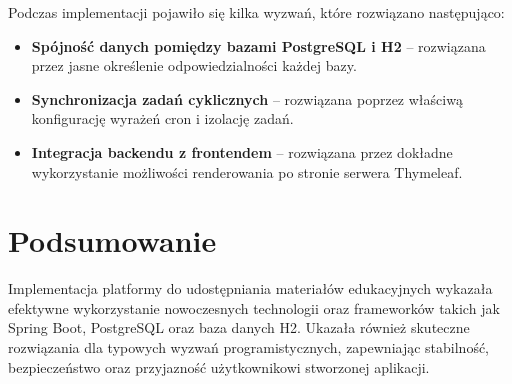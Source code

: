 Podczas implementacji pojawiło się kilka wyzwań, które rozwiązano następująco:

\begin{itemize}
\item \textbf{Spójność danych pomiędzy bazami PostgreSQL i H2} – rozwiązana przez jasne określenie odpowiedzialności każdej bazy.
\item \textbf{Synchronizacja zadań cyklicznych} – rozwiązana poprzez właściwą konfigurację wyrażeń cron i izolację zadań.
\item \textbf{Integracja backendu z frontendem} – rozwiązana przez dokładne wykorzystanie możliwości renderowania po stronie serwera Thymeleaf.
\end{itemize}

\section{Podsumowanie}

Implementacja platformy do udostępniania materiałów edukacyjnych wykazała efektywne wykorzystanie nowoczesnych technologii oraz frameworków takich jak Spring Boot, PostgreSQL oraz baza danych H2. Ukazała również skuteczne rozwiązania dla typowych wyzwań programistycznych, zapewniając stabilność, bezpieczeństwo oraz przyjazność użytkownikowi stworzonej aplikacji.

